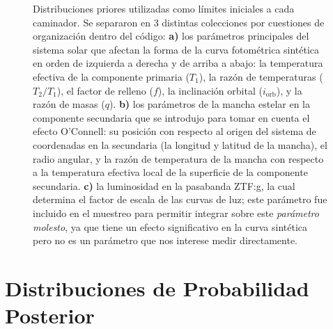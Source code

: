 \begin{figure}[!ht]
	\centering
	\caption{Distribuciones priores utilizadas como límites iniciales a cada
	caminador. Se separaron en 3 distintas colecciones por cuestiones de
	organización dentro del código: \textbf{a)} los parámetros principales del
	sistema solar que afectan la forma de la curva fotométrica sintética en
	orden de izquierda a derecha y de arriba a abajo: la temperatura efectiva de
	la componente primaria ($T_{1}$), la razón de temperaturas ($T_2/T_1$), el
	factor de relleno ($f$), la inclinación orbital ($i_{\mathrm{orb}}$), y la
	razón de masas ($q$). \textbf{b)} los parámetros de la mancha estelar en la
	componente secundaria que se introdujo para tomar en cuenta el efecto
	O'Connell: su posición con respecto al origen del sistema de coordenadas en
	la secundaria (la longitud y latitud de la mancha), el radio angular, y la
	razón de temperatura de la mancha con respecto a la temperatura efectiva
	local de la superficie de la componente secundaria. \textbf{c)} la
	luminosidad en la pasabanda ZTF:g, la cual determina el factor de escala de
	las curvas de luz; este parámetro fue incluido en el muestreo para permitir
	integrar sobre este \textit{parámetro molesto}, ya que tiene un efecto
	significativo en la curva sintética pero no es un parámetro que nos interese
	medir directamente.}
	\label{figuraColeccionesPrioresZtf}
\end{figure}

\section{Distribuciones de Probabilidad Posterior}

